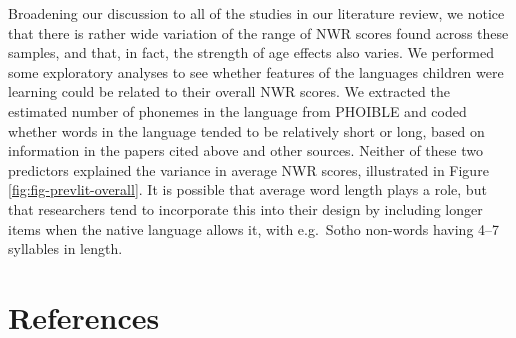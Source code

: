 \documentclass[
  american,
  ,doc,floatsintext]{apa6}
\begin{document}
Broadening our discussion to all of the studies in our literature review, we notice that there is rather wide variation of the range of NWR scores found across these samples, and that, in fact, the strength of age effects also varies. We performed some exploratory analyses to see whether features of the languages children were learning could be related to their overall NWR scores. We extracted the estimated number of phonemes in the language from PHOIBLE and coded whether words in the language tended to be relatively short or long, based on information in the papers cited above and other sources. Neither of these two predictors explained the variance in average NWR scores, illustrated in Figure \ref{fig:fig-prevlit-overall}. It is possible that average word length plays a role, but that researchers tend to incorporate this into their design by including longer items when the native language allows it, with e.g.~Sotho non-words having 4--7 syllables in length.

\hypertarget{references}{%
\section{References}\label{references}}

\setlength{\parindent}{-0.5in}
\setlength{\leftskip}{0.5in}
\end{document}
